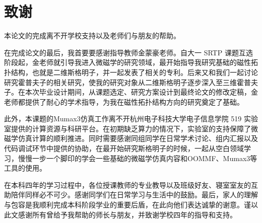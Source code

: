 \chapter*{致\hspace{1em}谢}

本论文的完成离不开学校支持以及老师们与朋友的帮助。

在完成论文的最后，我首要要感谢指导教师金蒙豪老师。自大一 SRTP 课题互选阶段起，金老师就引导我进入微磁学的研究领域，最开始指导我研究基础的磁性拓扑结构，也就是二维斯格明子，并一起发表了相关的专利。后来又和我们一起讨论研究霍普夫子的相关研究，使我的研究对象从二维斯格明子逐步深入至三维霍普夫子。在本次毕业设计期间，从课题选定、研究方案设计到最终论文的修改定稿，金老师都提供了耐心的学术指导，为我在磁性拓扑结构方向的研究奠定了基础。

此外，本课题的Mumax3仿真工作离不开杭州电子科技大学电子信息学院 519 实验室提供的计算资源与科研平台。在初期缺乏算力的情况下，实验室的支持保障了微磁学仿真计算的顺利推进。同时需要感谢同组同学在日常学术讨论、组内汇报以及代码调试环节中提供的协助，在最开始研究斯格明子的时候，一起从空白领域学习，慢慢一步一个脚印的学会一些基础的微磁学仿真内容和OOMMF、Mumax3等工具的使用。

在本科四年的学习过程中，各位授课教师的专业教导以及班级好友、寝室室友的互助陪伴同样必不可少。感谢同学们在日常学习与生活中的鼓励。最后，家人的理解与包容是我顺利完成本科阶段学业的重要后盾，在此向他们表达诚挚的谢意。谨以此文感谢所有曾给予我帮助的师长与朋友，并致谢学校四年的指导和支持。
